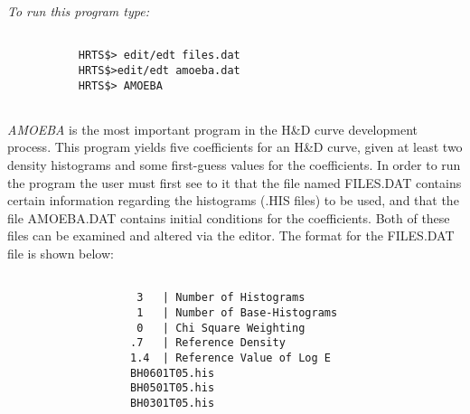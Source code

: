 {\em To run this program type:}
\begin{verbatim}
   
           HRTS$> edit/edt files.dat              
           HRTS$>edit/edt amoeba.dat
           HRTS$> AMOEBA
   
\end{verbatim}
{\em AMOEBA} is the most important program in the H\&D curve development
   process.  This program yields five coefficients for an H\&D curve, given
   at least two density histograms and some first-guess values for the
   coefficients.  In order to run the program the user must first see to
   it that the file named FILES.DAT contains certain information regarding
   the histograms (.HIS files) to be used, and that the file AMOEBA.DAT
   contains initial conditions for the coefficients.  Both of these files
   can be examined and altered via the editor.
      The format for the FILES.DAT file is shown below:
\begin{center}
\begin{verbatim}   
                
                    3   | Number of Histograms       
                    1   | Number of Base-Histograms   
                    0   | Chi Square Weighting        
                   .7   | Reference Density           
                   1.4  | Reference Value of Log E    
                   BH0601T05.his                      
                   BH0501T05.his                      
                   BH0301T05.his                      
\end{verbatim}
\end{center}                  
   
